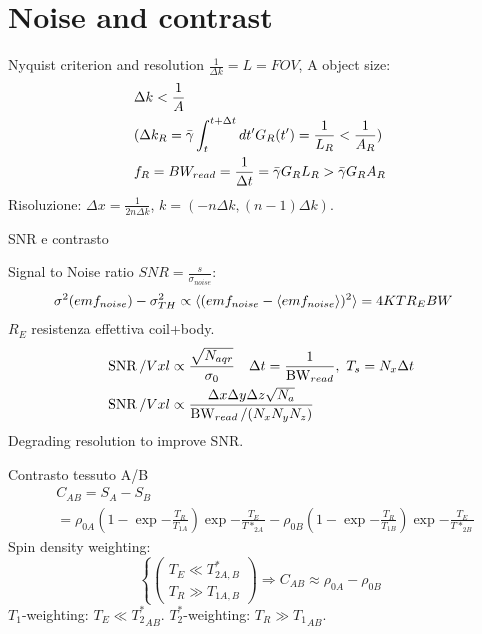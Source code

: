 
\section{Noise and contrast}

\begin{frame}{Nyquist criterion and resolution}
$\frac{1}{\Delta k}=L=FOV$, A object size:
\begin{align*}
&\Delta k<\frac{1}{A}\\
&(\Delta k_R=\gammabar\int_t^{t+\Delta t}d t'G_R(t')=\frac{1}{L_R}<\frac{1}{A_R})\\
&f_R=BW_{read}=\frac{1}{\Delta t}=\gammabar G_RL_R>\gammabar G_RA_R
\end{align*}
Risoluzione: $\Delta x=\frac{1}{2n\Delta k}$, $k=(-n\Delta k,(n-1)\Delta k)$.
\end{frame}

\begin{frame}[allowframebreaks]{SNR e contrasto}
\begin{block}{Signal to Noise ratio}
$SNR=\frac{s}{\sigma_{noise}}$:
\begin{align*}
&\sigma^2(emf_{noise})-\sigma_{TH}^2\propto\langle (emf_{noise}-\langle emf_{noise} \rangle)^2 \rangle=4KTR_EBW
\end{align*}
$R_E$ resistenza effettiva coil+body.
\begin{align*}
&\operatorname{SNR}/Vxl\propto\frac{\sqrt{N_{aqr}}}{\sigma_0}\quad \Delta t= \frac{1}{\operatorname{BW}_{read}},\ T_s=N_x\Delta t\\
&\operatorname{SNR}/Vxl\propto \frac{\Delta x\Delta y\Delta z\sqrt{N_a}}{\operatorname{BW}_{read}/(N_xN_yN_z)}
\end{align*}
Degrading resolution to improve SNR.
\end{block}
\begin{block}{Contrasto tessuto A/B}
\begin{align*}
&C_{AB}=S_A-S_B\\
&=\rho_{0A}(1-\exp{-\frac{T_R}{T_{1A}}})\exp{-\frac{T_E}{T*_{2A}}}-\rho_{0B}(1-\exp{-\frac{T_R}{T_{1B}}})\exp{-\frac{T_E}{T*_{2B}}}
\end{align*}
Spin density weighting:
\begin{equation*}
\left\{\begin{pmatrix}T_E\ll T_{2A,B}^*\\ T_R\gg T_{1A,B}\end{pmatrix}\right.\Rightarrow C_{AB}\approx\rho_{0A}-\rho_{0B}
\end{equation*}
$T_1$-weighting: $T_E\ll {T_2^*}_{AB}$.
$T_2^*$-weighting: $T_R\gg {T_1}_{AB}$.
\end{block}
\end{frame}